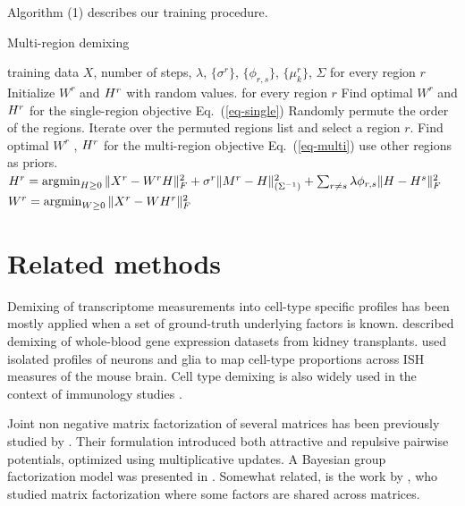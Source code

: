 \documentclass{article} %
\newcommand{\W}{W}
\renewcommand{\eqref}[1]{Eq.~(\ref{#1})}
\begin{document}
Algorithm (1) describes our training procedure.

\begin{algorithm}[tbh]
   \caption{Multi-region demixing}
   \label{alg:multimix}
   \begin{algorithmic}[1]
    training data $X$, number of steps, $\lambda$, $\{\sigma^r\}$, $\{\phi_{r,s}\}$, $\{\mu^r_k\}$, $\Sigma$
    for every region $r$
   \STATE \quad Initialize $\W^r$ and ${H}^r$ with random values.
    for every region $r$ 
   \STATE \quad Find optimal $\W^r$ and ${H}^r$ for the single-region objective \eqref{eq-single}
   \REPEAT
   \STATE Randomly permute the order of the regions.
   \STATE Iterate over the permuted regions list and select a region $r$.
   \STATE \quad Find optimal $\W^r$ , ${H}^r$ for the multi-region objective \eqref{eq-multi} use other regions as priors.
   \STATE \quad $H^r = \argmin_{H \geq 0 } \| X^r - W^rH\|^2_F + \sigma^r \| M^r - \H \|^2_{(\Sigma^{-1})} + \sum_{r \neq s} \lambda \phi_{r , s} \| \H - \H^s \|_F^2  $
   \STATE \quad $ W^r = \argmin_{W \geq 0} \| X^r - WH^r\|^2_F $
\end{algorithmic}
\end{algorithm}

\section{Related methods}
Demixing of transcriptome measurements into cell-type specific profiles has been mostly applied when a set of ground-truth underlying factors is known. \citet{shen2010cell} described demixing of 
whole-blood gene expression datasets from kidney transplants. \citet{grange2014cell} used isolated profiles of neurons and glia \cite{okaty2011cell} to map cell-type proportions across ISH measures of the mouse brain. Cell type demixing is also widely used in the context of immunology studies \cite{shen2013computational}.

Joint non negative matrix factorization of several matrices has been previously studied by \citet{lee2009group}. Their formulation introduced  both attractive and repulsive pairwise potentials, optimized using multiplicative updates. A Bayesian group factorization model was presented in \citet{shin2012bayesian}. Somewhat related, is the work by \citet{wang2012group}, who studied matrix factorization where some factors are shared across matrices.
\end{document}
